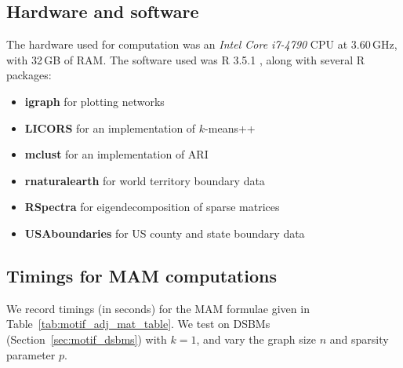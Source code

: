 \documentclass[12pt]{ociamthesis}
\theoremstyle{plain}
\theoremstyle{definition}
\theoremstyle{remark}
\begin{document}
\subsection{Hardware and software} \label{sec:notes_hardware}

The hardware used for computation was an \emph{Intel Core i7-4790} CPU at
3.60\,GHz, with 32\,GB of RAM. The software used was R 3.5.1
\cite{r_rsoftware}, along with several R packages:
%
%
\begin{itemize}
\item \textbf{igraph} \cite{r_igraph} for plotting networks
\item \textbf{LICORS} \cite{r_LICORS} for an implementation of $k$-means++
\item \textbf{mclust} \cite{r_mclust} for an implementation of ARI
\item
\textbf{rnaturalearth} \cite{r_rnaturalearth} for world territory boundary
data
\item \textbf{RSpectra} \cite{r_RSpectra} for eigendecomposition of
sparse matrices
\item \textbf{USAboundaries} \cite{r_USAboundaries} for US
county and state boundary data
\end{itemize}

\subsection{Timings for MAM computations} \label{sec:notes_timing}

We record timings (in seconds) for the MAM formulae given in
Table~\ref{tab:motif_adj_mat_table}. We test on DSBMs
(Section~\ref{sec:motif_dsbms}) with $k=1$, and vary the graph size $n$ and
sparsity parameter $p$.
\end{document}
